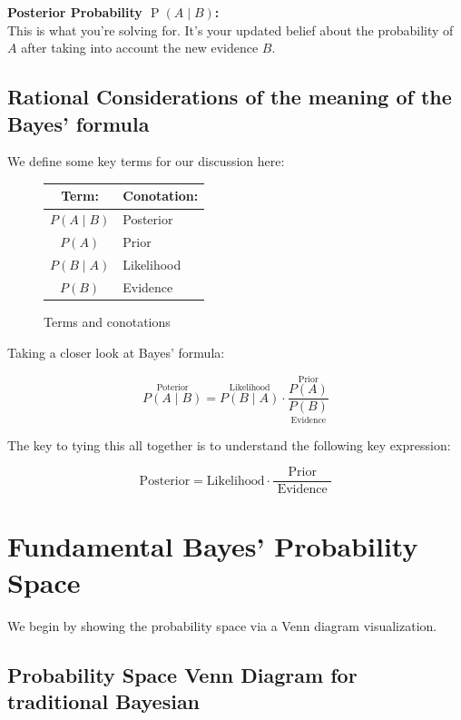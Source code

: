\documentclass[
  12 pt,
  a4paper,
]{book}
\numberwithin{equation}{section}
\theoremstyle{plain}      %
\theoremstyle{definition} %
\theoremstyle{remark}     %
\theoremstyle{note}         %
\begin{document}
\textbf{Posterior Probability \(\operatorname{P}(A\! \mid\! B)\):}\\
This is what you're solving for. It's your updated belief about the
probability of \(A\) after taking into account the new evidence \(B\).

\newpage

\hypertarget{rational-considerations-of-the-meaning-of-the-bayes-formula}{%
\subsection{Rational Considerations of the meaning of the Bayes'
formula}\label{rational-considerations-of-the-meaning-of-the-bayes-formula}}

We define some key terms for our discussion here:

\begin{figure}[htbp]
\centering
\begin{tabular}{|c|l|} 
Term: & Conotation: \\
\hline
$P(A\! \mid \! B)$ & Posterior \\
$P(A)$ & Prior \\
$P(B\! \mid \!A)$ & Likelihood \\
$P(B)$ & Evidence
\end{tabular}
\caption{Terms and conotations}
\label{fig:conotations}
\end{figure}

Taking a closer look at Bayes' formula:

\[
\overset{\text{Poterior}}{P(A \! \mid \! B)} 
= 
\overset{\text{Likelihood}}{P(B \! \mid \! A)} 
\cdot 
\frac{
    \overset{\text{Prior}}{P(A)}
}{
    \underset{\text{Evidence}}{P(B)}
}
\]

The key to tying this all together is to understand the following key
expression:

\[
\text {Posterior} = \text {Likelihood} \cdot \frac{\text { Prior }}{\text { Evidence }}
\]

\newpage

\hypertarget{fundamental-bayes-probability-space}{%
\section{Fundamental Bayes' Probability
Space}\label{fundamental-bayes-probability-space}}

We begin by showing the probability space via a Venn diagram
visualization.

\hypertarget{probability-space-venn-diagram-for-traditional-bayesian}{%
\subsection{Probability Space Venn Diagram for traditional
Bayesian}\label{probability-space-venn-diagram-for-traditional-bayesian}}
\end{document}
